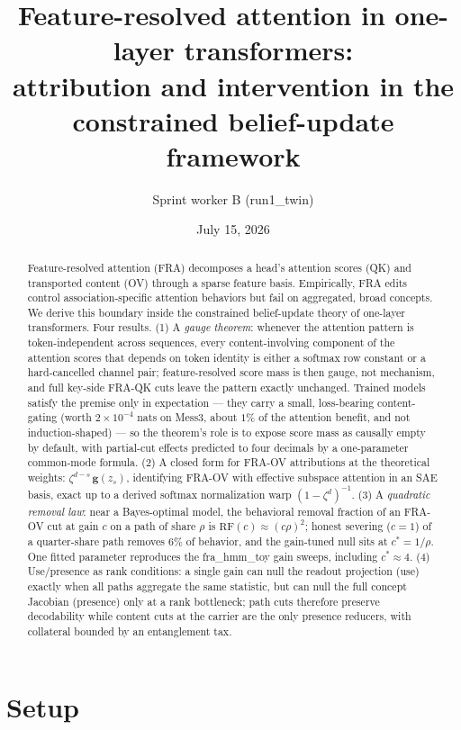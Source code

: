 \documentclass{article}
\title{Feature-resolved attention in one-layer transformers:\\
attribution and intervention in the constrained belief-update framework}
\author{Sprint worker B (run1\_twin)}
\date{July 15, 2026}
\newcommand{\gb}{\boldsymbol{g}}
\newcommand{\RF}{\mathrm{RF}}
\theoremstyle{definition}
\begin{document}
\maketitle

\begin{abstract}
Feature-resolved attention (FRA) decomposes a head's attention scores (QK) and
transported content (OV) through a sparse feature basis. Empirically, FRA edits
control association-specific attention behaviors but fail on aggregated,
broad concepts. We derive this boundary inside the constrained
belief-update theory of one-layer transformers. Four results. (1) A
\emph{gauge theorem}: whenever the attention pattern is token-independent
across sequences, every content-involving component of the attention scores
that depends on token identity is either a softmax row constant or a
hard-cancelled channel pair;
feature-resolved score mass is then gauge, not mechanism, and full key-side
FRA-QK cuts leave the pattern exactly unchanged. Trained models satisfy the
premise only in expectation --- they carry a small, loss-bearing
content-gating (worth $2\times10^{-4}$ nats on Mess3, about $1\%$ of the
attention benefit, and not induction-shaped) --- so the theorem's role is to expose score mass as
causally empty by default, with partial-cut effects predicted to four
decimals by a one-parameter common-mode formula. (2) A closed form for FRA-OV attributions at the theoretical
weights: $\zeta^{d-s}\,\gb(z_s)$, identifying FRA-OV with effective subspace
attention in an SAE basis, exact up to a derived softmax normalization warp
$(1-\zeta^d)^{-1}$. (3) A \emph{quadratic removal law}: near a Bayes-optimal
model, the behavioral removal fraction of an FRA-OV cut at gain $c$ on a path
of share $\rho$ is $\RF(c)\approx(c\rho)^2$; honest severing ($c=1$) of a
quarter-share path removes $6\%$ of behavior, and the gain-tuned null sits at
$c^\ast = 1/\rho$. One fitted parameter reproduces the fra\_hmm\_toy gain
sweeps, including $c^\ast\approx 4$. (4) Use/presence as rank conditions:
a single gain can null the readout projection (use) exactly when all paths
aggregate the same statistic, but can null the full concept Jacobian
(presence) only at a rank bottleneck; path cuts therefore preserve
decodability while content cuts at the carrier are the only presence
reducers, with collateral bounded by an entanglement tax.
\end{abstract}

\section{Setup}
\end{document}
